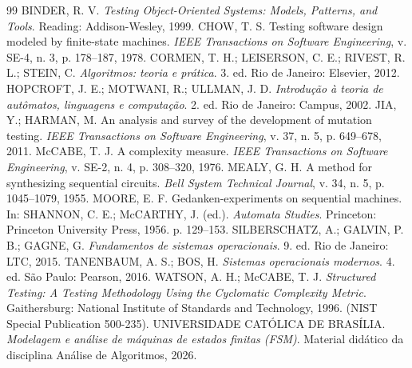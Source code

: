 \documentclass[11pt,a4paper]{article}
\theoremstyle{definition}
\begin{document}
\begin{thebibliography}{99}
 BINDER, R. V. \emph{Testing Object-Oriented Systems: Models, Patterns, and Tools}.
  Reading: Addison-Wesley, 1999.
 CHOW, T. S. Testing software design modeled by finite-state machines. \emph{IEEE
  Transactions on Software Engineering}, v. SE-4, n. 3, p. 178--187, 1978.
 CORMEN, T. H.; LEISERSON, C. E.; RIVEST, R. L.; STEIN, C. \emph{Algoritmos: teoria
  e prática}. 3. ed. Rio de Janeiro: Elsevier, 2012.
 HOPCROFT, J. E.; MOTWANI, R.; ULLMAN, J. D. \emph{Introdução à teoria de
  autômatos, linguagens e computação}. 2. ed. Rio de Janeiro: Campus, 2002.
 JIA, Y.; HARMAN, M. An analysis and survey of the development of mutation testing.
  \emph{IEEE Transactions on Software Engineering}, v. 37, n. 5, p. 649--678, 2011.
 McCABE, T. J. A complexity measure. \emph{IEEE Transactions on Software
  Engineering}, v. SE-2, n. 4, p. 308--320, 1976.
 MEALY, G. H. A method for synthesizing sequential circuits. \emph{Bell System
  Technical Journal}, v. 34, n. 5, p. 1045--1079, 1955.
 MOORE, E. F. Gedanken-experiments on sequential machines. In: SHANNON, C. E.;
  McCARTHY, J. (ed.). \emph{Automata Studies}. Princeton: Princeton University Press, 1956.
  p. 129--153.
 SILBERSCHATZ, A.; GALVIN, P. B.; GAGNE, G. \emph{Fundamentos de sistemas
  operacionais}. 9. ed. Rio de Janeiro: LTC, 2015.
 TANENBAUM, A. S.; BOS, H. \emph{Sistemas operacionais modernos}. 4. ed. São
  Paulo: Pearson, 2016.
 WATSON, A. H.; McCABE, T. J. \emph{Structured Testing: A Testing Methodology Using
  the Cyclomatic Complexity Metric}. Gaithersburg: National Institute of Standards and Technology,
  1996. (NIST Special Publication 500-235).
 UNIVERSIDADE CATÓLICA DE BRASÍLIA. \emph{Modelagem e análise de máquinas de estados
  finitas (FSM)}. Material didático da disciplina Análise de Algoritmos, 2026.
\end{thebibliography}
\end{document}
